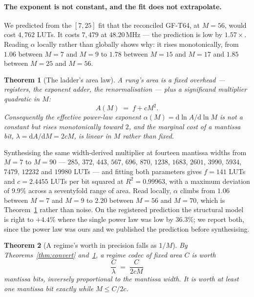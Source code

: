 \documentclass[11pt]{article}
\newtheorem{theorem}{Theorem}
\theoremstyle{definition}
\begin{document}
\paragraph{The exponent is not constant, and the fit does not extrapolate.} We
predicted from the $[7,25]$ fit that the reconciled GF-T64, at $M = 56$, would
cost $4{,}762$ LUTs. It costs $7{,}479$ at $48.20$\,MHz --- the prediction is low
by $1.57\times$. Reading $\alpha$ locally rather than globally shows why: it rises
monotonically, from $1.06$ between $M{=}7$ and $M{=}9$ to $1.78$ between $M{=}15$
and $M{=}17$ and $1.85$ between $M{=}25$ and $M{=}56$.

\begin{theorem}[The ladder's area law]
\label{thm:alpha}
A rung's area is a fixed overhead --- registers, the exponent adder, the
renormalisation --- plus a significand multiplier quadratic in $M$:
\[
A(M) \;=\; f + cM^{2}.
\]
Consequently the effective power-law exponent
$\alpha(M) = \mathrm{d}\ln A/\mathrm{d}\ln M$ is not a constant but rises
monotonically toward $2$, and the marginal cost of a mantissa bit,
$\lambda = \mathrm{d}A/\mathrm{d}M = 2cM$, is \emph{linear} in $M$ rather than
fixed.
\end{theorem}

Synthesising the same width-derived multiplier at fourteen mantissa widths from
$M{=}7$ to $M{=}90$ --- $285$, $372$, $443$, $567$, $696$, $870$, $1238$, $1683$,
$2601$, $3990$, $5934$, $7479$, $12232$ and $19980$ LUTs --- and fitting both
parameters gives $f = 141$ LUTs and $c = 2.4455$ LUTs per bit squared at
$R^2 = 0.99963$, with a maximum deviation of $9.9\%$ across a seventyfold range of
area. Read locally, $\alpha$ climbs from $1.06$ between $M{=}7$ and $M{=}9$ to
$2.20$ between $M{=}56$ and $M{=}70$, which is Theorem~\ref{thm:alpha} rather than
noise. On the registered prediction the structural model is right to $+4.4\%$
where the single power law was low by $36.3\%$; we report both, since the power
law was ours and we published the prediction before synthesising.

\begin{theorem}[A regime's worth in precision falls as $1/M$]
\label{thm:oneoverm}
By Theorems~\ref{thm:convert} and~\ref{thm:alpha}, a regime codec of fixed area
$C$ is worth
\[
\frac{C}{\lambda} \;=\; \frac{C}{2cM}
\]
mantissa bits, inversely proportional to the mantissa width. It is worth at least
one mantissa bit exactly while $M \leq C/2c$.
\end{theorem}
\end{document}
